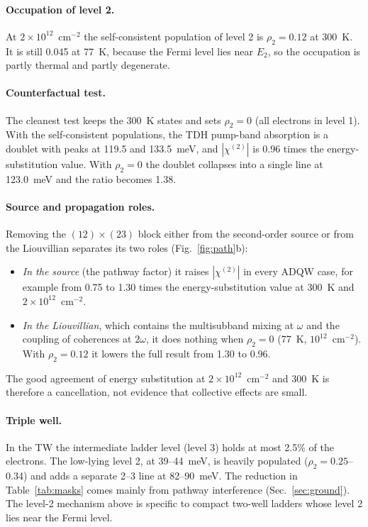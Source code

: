 \documentclass[11pt]{article}
\newcommand{\chitwo}{\chi^{(2)}}
\begin{document}
\paragraph{Occupation of level 2.} At $2\times10^{12}$~cm$^{-2}$ the self-consistent population of level 2 is $\rho_2=0.12$ at 300~K. It is still 0.045 at 77~K, because the Fermi level lies near $E_2$, so the occupation is partly thermal and partly degenerate.

\paragraph{Counterfactual test.} The cleanest test keeps the 300~K states and sets $\rho_2=0$ (all electrons in level 1). With the self-consistent populations, the TDH pump-band absorption is a doublet with peaks at 119.5 and 133.5~meV, and $|\chitwo|$ is 0.96 times the energy-substitution value. With $\rho_2=0$ the doublet collapses into a single line at 123.0~meV and the ratio becomes 1.38.

\paragraph{Source and propagation roles.} Removing the $(12)\times(23)$ block either from the second-order source or from the Liouvillian separates its two roles (Fig.~\ref{fig:path}b):
\begin{itemize}
\item \emph{In the source} (the pathway factor) it raises $|\chitwo|$ in every ADQW case, for example from 0.75 to 1.30 times the energy-substitution value at 300~K and $2\times10^{12}$~cm$^{-2}$.
\item \emph{In the Liouvillian}, which contains the multisubband mixing at $\omega$ and the coupling of coherences at $2\omega$, it does nothing when $\rho_2=0$ (77~K, $10^{12}$~cm$^{-2}$). With $\rho_2=0.12$ it lowers the full result from 1.30 to 0.96.
\end{itemize}
The good agreement of energy substitution at $2\times10^{12}$~cm$^{-2}$ and 300~K is therefore a cancellation, not evidence that collective effects are small.

\paragraph{Triple well.} In the TW the intermediate ladder level (level 3) holds at most 2.5\% of the electrons. The low-lying level 2, at 39--44~meV, is heavily populated ($\rho_2=0.25$--0.34) and adds a separate 2--3 line at 82--90~meV. The reduction in Table~\ref{tab:masks} comes mainly from pathway interference (Sec.~\ref{sec:ground}). The level-2 mechanism above is specific to compact two-well ladders whose level 2 lies near the Fermi level.
\end{document}
